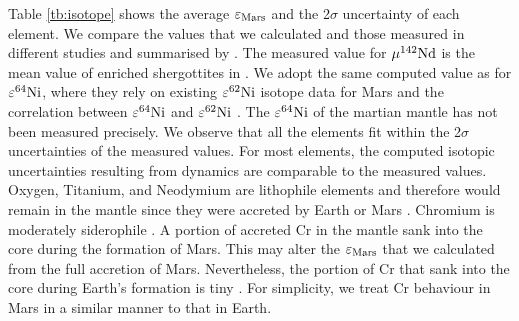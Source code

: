\documentclass{aa}
\begin{document}
Table \ref{tb:isotope} shows the average $\varepsilon_{\rm Mars}$ and the 2$\sigma$ uncertainty of each element. We compare the values that we calculated and those measured in different studies and summarised by \cite{dauphas2017isotopic}. The measured value for $\mu^{142} \rm Nd$ is the mean value of enriched shergottites in \cite{kruijer2017early}. We adopt the same computed value as \cite{brasser2018GRL} for $\varepsilon^{64}\rm Ni$, where they rely on existing $\varepsilon^{62}\rm Ni$ isotope data for Mars and the correlation between $\varepsilon^{64}\rm Ni$ and $\varepsilon^{62}\rm Ni$ \citep{tang201460fe}. The $\varepsilon^{64}\rm Ni$ of the martian mantle has not been measured precisely. We observe that all the elements fit within the 2$\sigma$ uncertainties of the measured values. For most elements, the computed isotopic uncertainties resulting from dynamics are comparable to the measured values. Oxygen, Titanium, and Neodymium are lithophile elements and therefore would remain in the mantle since they were accreted by Earth or Mars \citep{dauphas2017isotopic}. Chromium is moderately siderophile \citep[e.g.][] {righter2011moderately}. A portion of accreted Cr in the mantle sank into the core during the formation of Mars. This may alter the $\varepsilon_{\rm Mars}$ that we calculated from the full accretion of Mars. Nevertheless, the portion of Cr that sank into the core during Earth’s formation is tiny \citep{dauphas2017isotopic}. For simplicity, we treat Cr behaviour in Mars in a similar manner to that in Earth.
\end{document}
